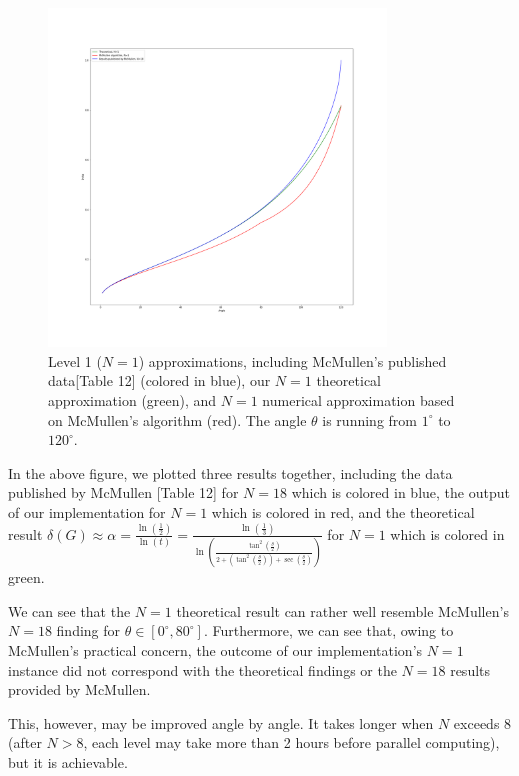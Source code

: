 \documentclass[12pt,oneside]{sfsuthesis}
\theoremstyle{plain} %
\theoremstyle{definition}  %
\theoremstyle{remark}  %
\theoremstyle{plain}
\begin{document}
{\begin{figure}[H]
\centering
\includegraphics[width=0.8\textwidth]{McMullens example.png}
\caption{Level 1 ($N=1$) approximations, including McMullen's published data\cite{mcmullen1998hausdorff}[Table 12] (colored in blue), our $N=1$ theoretical approximation (green), and $N=1$ numerical approximation based on McMullen's algorithm (red). The angle $\theta$ is running from $1^\circ$ to $120^\circ$. }
\end{figure}

In the above figure, we plotted three results together, including the data published by McMullen \cite{mcmullen1998hausdorff}[Table 12] for $N=18$ which is colored in blue, the output of our implementation for $N=1$ which is colored in red, and the theoretical result $
\delta(G)\approx \alpha=\frac{\ln\left(\frac{1}{2}\right)}{\ln\left(t \right)}
=\frac{\ln\left(\frac{1}{3}\right)}{\ln\left(\frac{\tan^2\left(\frac{\theta}{2}\right)}{2+\left(\tan^2\left(\frac{\theta}{2}\right)\right)+\sec\left(\frac{\theta}{2}\right)} \right)}
$ for $N=1$ which is colored in green.


We can see that the $N=1$ theoretical result can rather well resemble McMullen's $N=18$ finding\cite{mcmullen1998hausdorff} for $\theta\in [0^\circ,80^\circ]$. Furthermore, we can see that, owing to McMullen's practical concern, the outcome of our implementation's $N=1$ instance did not correspond with the theoretical findings or the $N=18$ results provided by McMullen.


This, however, may be improved angle by angle. It takes longer when $N$ exceeds $8$ (after $N>8$, each level may take more than 2 hours before parallel computing), but it is achievable.

}
\end{document}

